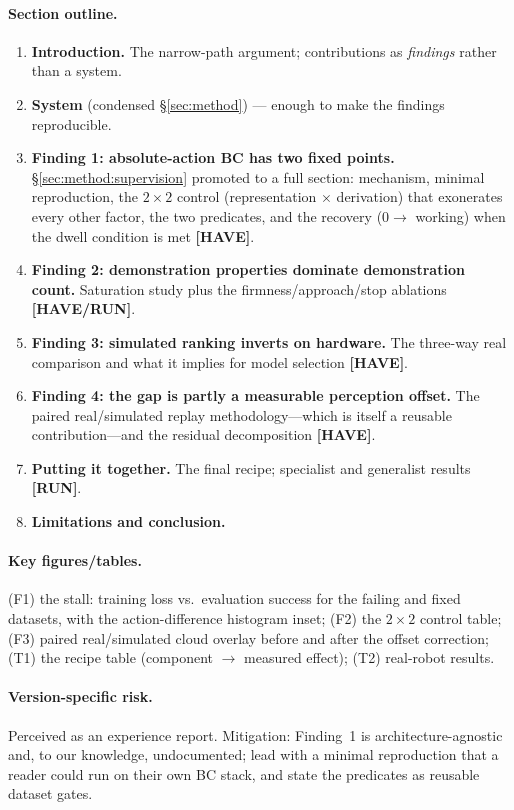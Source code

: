 \paragraph{Section outline.}
\begin{enumerate}
  \item \textbf{Introduction.} The narrow-path argument; contributions as \emph{findings}
        rather than a system.
  \item \textbf{System} (condensed \S\ref{sec:method}) --- enough to make the findings
        reproducible.
  \item \textbf{Finding 1: absolute-action BC has two fixed points.}
        \S\ref{sec:method:supervision} promoted to a full section: mechanism, minimal
        reproduction, the $2\times2$ control (representation $\times$ derivation) that
        exonerates every other factor, the two predicates, and the recovery
        ($0 \rightarrow$ working) when the dwell condition is met \textbf{[HAVE]}.
  \item \textbf{Finding 2: demonstration properties dominate demonstration count.}
        Saturation study plus the firmness/approach/stop ablations \textbf{[HAVE/RUN]}.
  \item \textbf{Finding 3: simulated ranking inverts on hardware.} The three-way real
        comparison and what it implies for model selection \textbf{[HAVE]}.
  \item \textbf{Finding 4: the gap is partly a measurable perception offset.} The paired
        real/simulated replay methodology---which is itself a reusable contribution---and the
        residual decomposition \textbf{[HAVE]}.
  \item \textbf{Putting it together.} The final recipe; specialist and generalist results
        \textbf{[RUN]}.
  \item \textbf{Limitations and conclusion.}
\end{enumerate}

\paragraph{Key figures/tables.}
(F1) the stall: training loss vs.\ evaluation success for the failing and fixed datasets,
with the action-difference histogram inset; (F2) the $2\times2$ control table; (F3) paired
real/simulated cloud overlay before and after the offset correction; (T1) the recipe table
(component $\rightarrow$ measured effect); (T2) real-robot results.

\paragraph{Version-specific risk.} Perceived as an experience report. Mitigation: Finding~1 is
architecture-agnostic and, to our knowledge, undocumented; lead with a minimal reproduction
that a reader could run on their own BC stack, and state the predicates as reusable dataset
gates.

